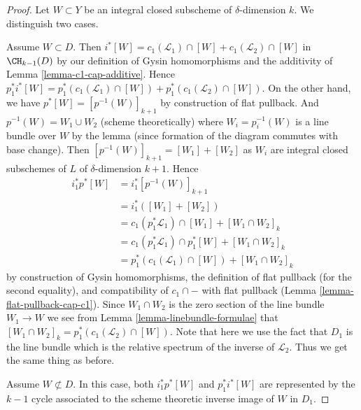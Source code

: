\begin{proof}
Let $W \subset Y$ be an integral closed subscheme of $\delta$-dimension $k$.
We distinguish two cases.

\medskip\noindent
Assume $W \subset D$. Then
$i^*[W] = c_1(\mathcal{L}_1) \cap [W] + c_1(\mathcal{L}_2) \cap [W]$
in $\CH_{k - 1}(D)$ by our definition of Gysin homomorphisms and the
additivity of Lemma \ref{lemma-c1-cap-additive}.
Hence $p_1^*i^*[W] =
p_1^*(c_1(\mathcal{L}_1) \cap [W]) + p_1^*(c_1(\mathcal{L}_2) \cap [W])$.
On the other hand, we have
$p^*[W] = [p^{-1}(W)]_{k + 1}$ by construction of flat pullback.
And $p^{-1}(W) = W_1 \cup W_2$ (scheme theoretically)
where $W_i = p_i^{-1}(W)$ is a line bundle over $W$
by the lemma (since formation of the diagram commutes with base change).
Then $[p^{-1}(W)]_{k + 1} = [W_1] + [W_2]$ as $W_i$ are integral closed
subschemes of $L$ of $\delta$-dimension $k + 1$. Hence
\begin{align*}
i_1^*p^*[W]
& =
i_1^*[p^{-1}(W)]_{k + 1} \\
& =
i_1^*([W_1] + [W_2]) \\
& =
c_1(p_1^*\mathcal{L}_1) \cap [W_1] + [W_1 \cap W_2]_k \\
& =
c_1(p_1^*\mathcal{L}_1) \cap p_1^*[W] + [W_1 \cap W_2]_k \\
& =
p_1^*(c_1(\mathcal{L}_1) \cap [W]) + [W_1 \cap W_2]_k
\end{align*}
by construction of Gysin homomorphisms, the definition of flat pullback
(for the second equality), and compatibility of $c_1 \cap -$
with flat pullback (Lemma \ref{lemma-flat-pullback-cap-c1}).
Since $W_1 \cap W_2$ is the zero section of the line bundle
$W_1 \to W$ we see from Lemma \ref{lemma-linebundle-formulae}
that $[W_1 \cap W_2]_k = p_1^*(c_1(\mathcal{L}_2) \cap [W])$.
Note that here we use the fact that $D_1$ is the line bundle
which is the relative spectrum of the inverse of $\mathcal{L}_2$.
Thus we get the same thing as before.

\medskip\noindent
Assume $W \not \subset D$. In this case, both $i_1^*p^*[W]$
and $p_1^*i^*[W]$ are represented by the $k - 1$ cycle associated
to the scheme theoretic inverse image of $W$ in $D_1$.
\end{proof}

